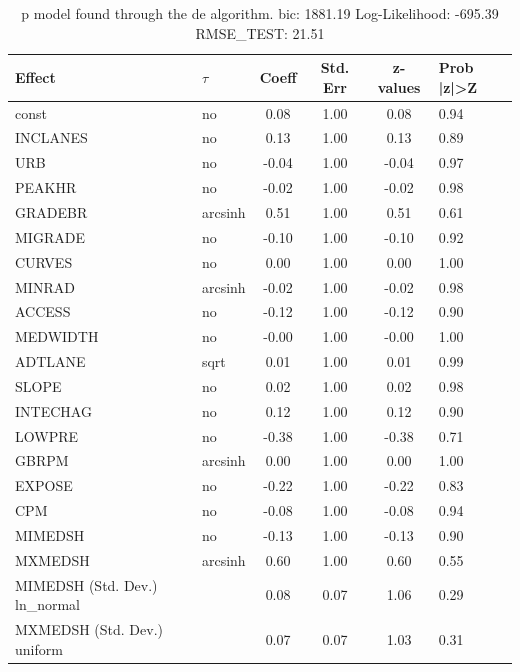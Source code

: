 \begin{table}
	\caption{p model found through the de algorithm. bic: 1881.19 Log-Likelihood: -695.39 RMSE_TEST: 21.51}
	\begin{center}
		\begin{tabular}{|l|l|c|c|c|l|}
			\hline
			Effect & $\tau$ & Coeff & Std. Err & z-values & Prob |z|>Z \\
			\hline
			const & no & 0.08 & 1.00 & 0.08 & 0.94 \\
			\hline
			INCLANES & no & 0.13 & 1.00 & 0.13 & 0.89 \\
			\hline
			URB & no & -0.04 & 1.00 & -0.04 & 0.97 \\
			\hline
			PEAKHR & no & -0.02 & 1.00 & -0.02 & 0.98 \\
			\hline
			GRADEBR & arcsinh & 0.51 & 1.00 & 0.51 & 0.61 \\
			\hline
			MIGRADE & no & -0.10 & 1.00 & -0.10 & 0.92 \\
			\hline
			CURVES & no & 0.00 & 1.00 & 0.00 & 1.00 \\
			\hline
			MINRAD & arcsinh & -0.02 & 1.00 & -0.02 & 0.98 \\
			\hline
			ACCESS & no & -0.12 & 1.00 & -0.12 & 0.90 \\
			\hline
			MEDWIDTH & no & -0.00 & 1.00 & -0.00 & 1.00 \\
			\hline
			ADTLANE & sqrt & 0.01 & 1.00 & 0.01 & 0.99 \\
			\hline
			SLOPE & no & 0.02 & 1.00 & 0.02 & 0.98 \\
			\hline
			INTECHAG & no & 0.12 & 1.00 & 0.12 & 0.90 \\
			\hline
			LOWPRE & no & -0.38 & 1.00 & -0.38 & 0.71 \\
			\hline
			GBRPM & arcsinh & 0.00 & 1.00 & 0.00 & 1.00 \\
			\hline
			EXPOSE & no & -0.22 & 1.00 & -0.22 & 0.83 \\
			\hline
			CPM & no & -0.08 & 1.00 & -0.08 & 0.94 \\
			\hline
			MIMEDSH & no & -0.13 & 1.00 & -0.13 & 0.90 \\
			\hline
			MXMEDSH & arcsinh & 0.60 & 1.00 & 0.60 & 0.55 \\
			\hline
			MIMEDSH (Std. Dev.) ln_normal &  & 0.08 & 0.07 & 1.06 & 0.29 \\
			\hline
			MXMEDSH (Std. Dev.) uniform &  & 0.07 & 0.07 & 1.03 & 0.31 \\
			\hline
		\end{tabular}
	\end{center}
\end{table}